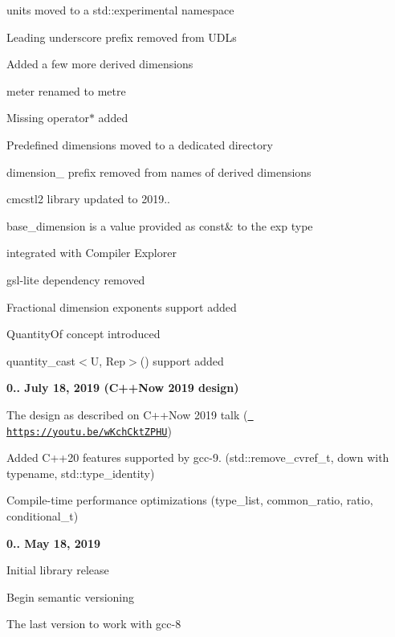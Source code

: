 \begin{DoxyItemize}
\begin{DoxyItemize}
\begin{DoxyItemize}
\end{DoxyItemize}
\item {\ttfamily units} moved to a {\ttfamily std\+::experimental} namespace
\item Leading underscore prefix removed from UDLs
\item Added a few more derived dimensions
\item {\ttfamily meter} renamed to {\ttfamily metre}
\item Missing {\ttfamily operator$\ast$} added
\item Predefined dimensions moved to a dedicated directory
\item {\ttfamily dimension\+\_\+} prefix removed from names of derived dimensions
\item cmcstl2 library updated to 2019..
\item {\ttfamily base\+\_\+dimension} is a value provided as {\ttfamily const\&} to the {\ttfamily exp} type
\item integrated with Compiler Explorer
\item gsl-\/lite dependency removed
\item Fractional dimension exponents support added
\item {\ttfamily Quantity\+Of} concept introduced
\item {\ttfamily quantity\+\_\+cast\texorpdfstring{$<$}{<}U, Rep\texorpdfstring{$>$}{>}()} support added
\end{DoxyItemize}
\item {\bfseries{0.. July 18, 2019 (C++\+Now 2019 design)}}
\begin{DoxyItemize}
\item The design as described on C++\+Now 2019 talk (\href{https://youtu.be/wKchCktZPHU}{\texttt{ https\+://youtu.\+be/w\+Kch\+Ckt\+ZPHU}})
\item Added C++20 features supported by gcc-\/9. ({\ttfamily std\+::remove\+\_\+cvref\+\_\+t}, down with typename, {\ttfamily std\+::type\+\_\+identity})
\item Compile-\/time performance optimizations ({\ttfamily type\+\_\+list}, {\ttfamily common\+\_\+ratio}, {\ttfamily ratio}, {\ttfamily conditional\+\_\+t})
\end{DoxyItemize}
\item {\bfseries{0.. May 18, 2019}}
\begin{DoxyItemize}
\item Initial library release
\item Begin semantic versioning
\item The last version to work with gcc-\/8 
\end{DoxyItemize}
\end{DoxyItemize}